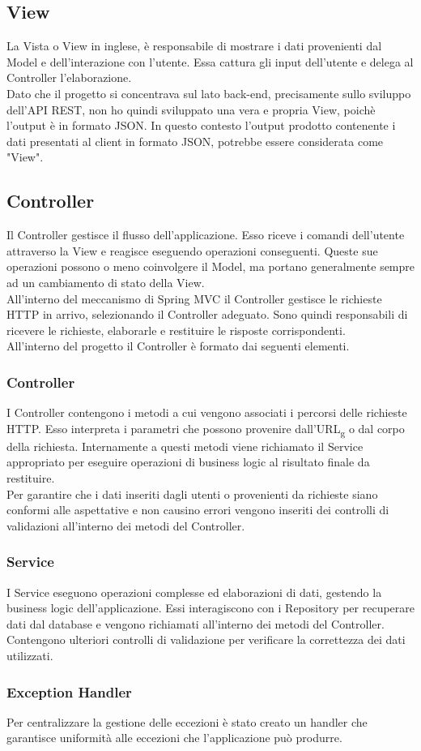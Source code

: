 \subsection{View}
La Vista o View in inglese, è responsabile di mostrare i dati provenienti dal Model e dell'interazione con l'utente. Essa cattura gli input dell'utente e delega al Controller l'elaborazione.\\
Dato che il progetto si concentrava sul lato back-end, precisamente sullo sviluppo dell'API REST, non ho quindi sviluppato una vera e propria View, poichè l'output è in formato JSON. In questo contesto l'output prodotto contenente i dati presentati al client in formato JSON, potrebbe essere considerata come "View".\\

\subsection{Controller}
Il Controller gestisce il flusso dell'applicazione. Esso riceve i comandi dell'utente attraverso la View e reagisce eseguendo operazioni conseguenti. Queste sue operazioni possono o meno coinvolgere il Model, ma portano generalmente sempre ad un cambiamento di stato della View.\\
All'interno del meccanismo di Spring MVC il Controller gestisce le richieste HTTP in arrivo, selezionando il Controller adeguato. Sono quindi responsabili di ricevere le richieste, elaborarle e restituire le risposte corrispondenti.\\
All'interno del progetto il Controller è formato dai seguenti elementi.
\subsubsection*{Controller}
I Controller contengono i metodi a cui vengono associati i percorsi delle richieste HTTP. Esso interpreta i parametri che possono provenire dall'URL\textsubscript{g} o dal corpo della richiesta. Internamente a questi metodi viene richiamato il Service appropriato per eseguire operazioni di business logic al risultato finale da restituire.\\
Per garantire che i dati inseriti dagli utenti o provenienti da richieste siano conformi alle aspettative e non causino errori vengono inseriti dei controlli di validazioni all'interno dei metodi del Controller.
\subsubsection*{Service}
I Service eseguono operazioni complesse ed elaborazioni di dati, gestendo la business logic dell'applicazione. Essi interagiscono con i Repository per recuperare dati dal database e vengono richiamati all'interno dei metodi del Controller. Contengono ulteriori controlli di validazione per verificare la correttezza dei dati utilizzati.
\subsubsection*{Exception Handler}
Per centralizzare la gestione delle eccezioni è stato creato un handler che garantisce uniformità alle eccezioni che l'applicazione può produrre.\\
